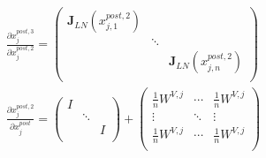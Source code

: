 \documentclass{article}
\begin{document}
\begin{gather}
\frac{\partial x_j^{post,3}}{\partial x_j^{post,2}}=\left(
  \begin{array}{ccc}
    \mathbf{J}_{LN}(x_{j,1}^{post,2}) &  &  \\
     & \ddots &  \\
     &  & \mathbf{J}_{LN}(x_{j,n}^{post,2}) \\
  \end{array}
\right)\\
\frac{\partial x_j^{post,2}}{\partial x_j^{post}}=\left(
  \begin{array}{ccc}
    I &  &  \\
     & \ddots &  \\
     &  &  I\\
  \end{array}
\right)+
\left(
  \begin{array}{ccc}
    \frac{1}{n}W^{V,j} & \cdots & \frac{1}{n}W^{V,j} \\
    \vdots & \ddots & \vdots \\
    \frac{1}{n}W^{V,j} & \cdots & \frac{1}{n}W^{V,j} \\
  \end{array}
\right)
\end{gather}
\end{document}
